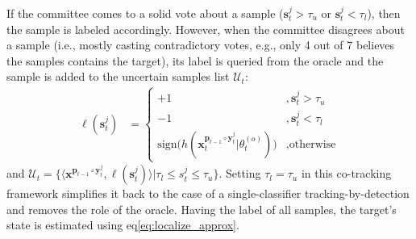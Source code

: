 \documentclass[10pt, conference, compsocconf]{IEEEtran}
\begin{document}
If the committee comes to a solid vote about a sample ($\mathbf{s}^j_t > \tau_u$ or $\mathbf{s}^j_t < \tau_l$), then the sample is labeled accordingly. However, when the committee disagrees about a sample (i.e., mostly casting contradictory votes, e.g., only 4 out of 7 believes the samples contains the target), its label is queried from the oracle and the sample is added to the uncertain samples list $\mathcal{U}_t$:
\begin{align}
\ell(\mathbf{s}^j_t) &=
  \begin{cases}
   +1                                                                        & ,\mathbf{s}^j_t > \tau_u \\
   -1                                                                        & ,\mathbf{s}^j_t < \tau_l \\
  \mathrm{sign} \big( h(\mathbf{x}_t^{\mathbf{p}_{t-1} \circ \mathbf{y}_t^j} | \theta^{(o)}_t) \big)    & ,\text{otherwise}
  \end{cases}
  \label{eq:label_qbst}
\end{align}
and $\mathcal{U}_t = \{\langle \mathbf{x}^{\mathbf{p}_{t-1} \circ \mathbf{y}^j_t} , \ell(\mathbf{s}^j_t) \rangle | \tau_l \leq s_t^j \leq \tau_u \}$. Setting $\tau_l = \tau_u$ in this co-tracking framework simplifies it back to the case of a single-classifier tracking-by-detection and removes the role of the oracle.
Having the label of all samples, the target's state is estimated using eq\eqref{eq:localize_approx}.
\end{document}
